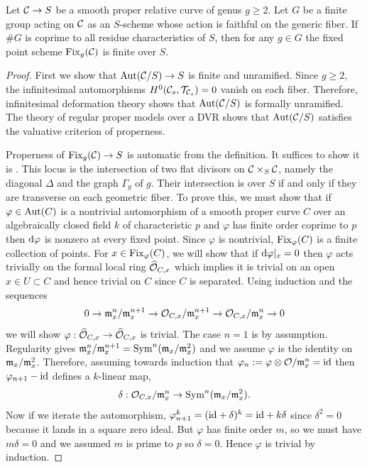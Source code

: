 \documentclass[main.tex]{subfiles}
\begin{document}
\begin{lemma} \label{lemma:etale_fixed_locus}
Let $\mathcal{C} \to S$ be a smooth proper relative curve of genus $g \ge 2$. Let $G$ be a finite group acting on $\mathcal{C}$ as an $S$-scheme whose action is faithful on the generic fiber. If $\# G$ is coprime to all residue characteristics of $S$, then for any $g \in G$ the fixed point scheme $\operatorname{\mathrm{Fix}}_g(\mathcal{C})$ is finite \etale over $S$. 
\end{lemma}

\begin{proof}
First we show that $\operatorname{\mathrm{Aut}}(\mathcal{C}/S) \to S$ is finite and unramified. Since $g \ge 2$, the infinitesimal automorphisms $H^0(\mathcal{C}_s, \mathcal{T}_{\mathcal{C}_s}) = 0$ vanish on each fiber. Therefore, infinitesimal deformation theory shows that $\operatorname{\mathrm{Aut}}(\mathcal{C}/S)$ is formally unramified. The theory of regular proper models over a DVR shows that $\operatorname{\mathrm{Aut}}(\mathcal{C}/S)$ satisfies the valuative criterion of properness. 
\par 
Properness of $\operatorname{\mathrm{Fix}}_g(\mathcal{C}) \to S$ is automatic from the definition. It suffices to show it is \etale. This locus is the intersection of two flat divisors on $\mathcal{C} \times_S \mathcal{C}$, namely the diagonal $\Delta$ and the graph $\Gamma_g$ of $g$. Their intersection is \etale over $S$ if and only if they are transverse on each geometric fiber. To prove this, we must show that if $\varphi \in \operatorname{\mathrm{Aut}}(C)$ is a nontrivial automorphism of a smooth proper curve $C$ over an algebraically closed field $k$ of characteristic $p$ and $\varphi$ has finite order coprime to $p$ then $\mathrm{d}{\varphi}$ is nonzero at every fixed point. Since $\varphi$ is nontrivial, $\operatorname{\mathrm{Fix}}_{\varphi}(C)$ is a finite collection of points. For $x \in \operatorname{\mathrm{Fix}}_{\varphi}(C)$, we will show that if $\mathrm{d}{\varphi}|_x = 0$ then $\varphi$ acts trivially on the formal local ring $\widehat{\mathcal{O}}_{C,x}$ which implies it is trivial on an open $x \in U \subset C$ and hence trivial on $C$ since $C$ is separated. Using induction and the sequences
\[ 0 \to \mathfrak{m}_x^n / \mathfrak{m}_x^{n+1} \to \mathcal{O}_{C,x} / \mathfrak{m}_x^{n+1} \to \mathcal{O}_{C,x} / \mathfrak{m}_x^{n} \to 0 \]
we will show $\varphi : \widehat{\mathcal{O}}_{C,x} \to \widehat{\mathcal{O}}_{C,x}$ is trivial. The case $n = 1$ is by assumption. Regularity gives $\mathfrak{m}_x^n / \mathfrak{m}_x^{n+1} = \operatorname{\mathrm{Sym}}^n (\mathfrak{m}_x / \mathfrak{m}_x^2)$ and we assume $\varphi$ is the identity on $\mathfrak{m}_x / \mathfrak{m}_x^2$. Therefore, assuming towards induction that $\varphi_n := \varphi \otimes \mathcal{O} / \mathfrak{m}_x^n = \mathrm{id}$ then $\varphi_{n+1} - \mathrm{id}$ defines a $k$-linear map,
\[ \delta : \mathcal{O}_{C,x} / \mathfrak{m}_x^{n} \to \operatorname{\mathrm{Sym}}^n (\mathfrak{m}_x / \mathfrak{m}_x^2). \]
Now if we iterate the automorphism, $\varphi^k_{n+1} = (\mathrm{id} + \delta)^k = \mathrm{id} + k \delta$ since $\delta^2 = 0$ because it lands in a square zero ideal. But $\varphi$ has finite order $m$, so we must have $m \delta = 0$ and we assumed $m$ is prime to $p$ so $\delta = 0$. Hence $\varphi$ is trivial by induction. 
\end{proof}
\end{document}
